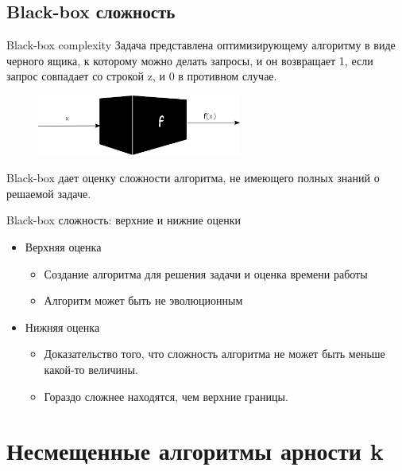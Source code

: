 \documentclass{beamer}
\begin{document}


 \subsection{Black-box сложность}
 
 \begin{frame}{Black-box complexity}
    Задача представлена оптимизирующему алгоритму в виде черного ящика, к которому можно делать запросы, и он возвращает 1, если запрос совпадает со строкой z, и 0 в противном случае.
    \begin{figure}[h]
    \includegraphics[height=2cm]{blackbox.png}
    \end{figure}
    Black-box дает оценку сложности алгоритма, не имеющего полных знаний о решаемой задаче.   
 \end{frame}
 
  \begin{frame}{Black-box сложность: верхние и нижние оценки}
  \begin{itemize}
   \item Верхняя оценка
        \begin{itemize}
            \item Создание алгоритма для решения задачи и оценка  времени работы
            \item Алгоритм может быть не эволюционным
        \end{itemize}
    \item Нижняя оценка
        \begin{itemize}
            \item Доказательство того, что сложность алгоритма не может быть меньше какой-то величины.
            \item Гораздо сложнее находятся, чем верхние границы.
        \end{itemize}
    \end{itemize}
 \end{frame}


 \section{Несмещенные алгоритмы арности k}
 
\end{document}
